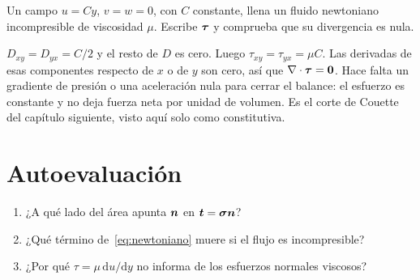 \begin{problembox}[Básico]
Un campo \(u=Cy\), \(v=w=0\), con \(C\) constante, llena un fluido newtoniano incompresible de viscosidad \(\mu\). Escribe \(\boldsymbol{\tau}\) y comprueba que su divergencia es nula.
\end{problembox}
\begin{solutionbox}
\(D_{xy}=D_{yx}=C/2\) y el resto de \(D\) es cero. Luego \(\tau_{xy}=\tau_{yx}=\mu C\). Las derivadas de esas componentes respecto de \(x\) o de \(y\) son cero, así que \(\nabla\cdot\boldsymbol{\tau}=\boldsymbol{0}\). Hace falta un gradiente de presión o una aceleración nula para cerrar el balance: el esfuerzo es constante y no deja fuerza neta por unidad de volumen. Es el corte de Couette del capítulo siguiente, visto aquí solo como constitutiva.
\end{solutionbox}

\section{Autoevaluación}
\begin{enumerate}[leftmargin=1.4em]
\item ¿A qué lado del área apunta \(\boldsymbol{n}\) en \(\boldsymbol{t}=\boldsymbol{\sigma}\boldsymbol{n}\)?
\item ¿Qué término de~\eqref{eq:newtoniano} muere si el flujo es incompresible?
\item ¿Por qué \(\tau=\mu\,\mathrm{d}u/\mathrm{d}y\) no informa de los esfuerzos normales viscosos?
\end{enumerate}
